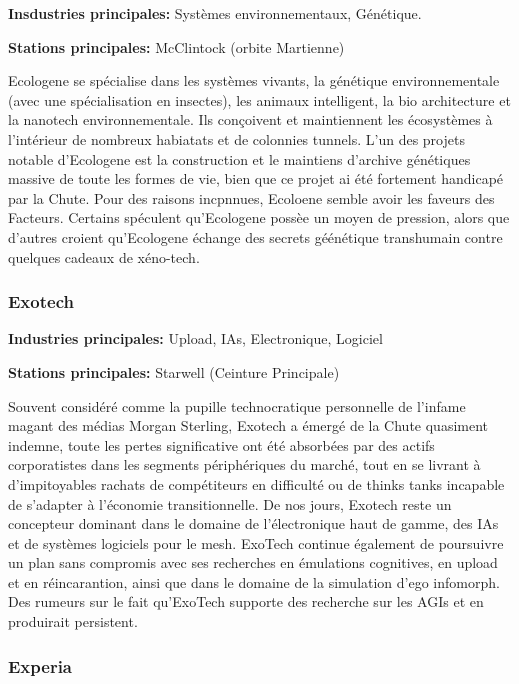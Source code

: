                   \textbf{Insdustries principales:} Systèmes environnementaux, Génétique. 

                  \textbf{Stations principales:} McClintock (orbite Martienne) 

                  Ecologene se spécialise dans les systèmes vivants, la génétique environnementale (avec une spécialisation en insectes), les animaux intelligent, la bio architecture et la nanotech environnementale. Ils conçoivent et maintiennent les écosystèmes à l'intérieur de nombreux habiatats et de colonnies tunnels. L'un des projets notable d'Ecologene est la construction et le maintiens d'archive génétiques massive de toute les formes de vie, bien que ce projet ai été fortement handicapé par la Chute. Pour des raisons incpnnues, Ecoloene semble avoir les faveurs des Facteurs. Certains spéculent qu'Ecologene possèe un moyen de pression, alors que d'autres croient qu'Ecologene échange des secrets géénétique transhumain contre quelques cadeaux de xéno-tech. 

                  \subsubsection{Exotech} \label{sec:exotech} 

                  \textbf{Industries principales:} Upload, IAs, Electronique, Logiciel 

                  \textbf{Stations principales:} Starwell (Ceinture Principale) 

                  Souvent considéré comme la pupille technocratique personnelle de l'infame magant des médias Morgan Sterling, Exotech a émergé de la Chute quasiment indemne, toute les pertes significative ont été absorbées par des actifs corporatistes dans les segments périphériques du marché, tout en  se livrant à d'impitoyables rachats de compétiteurs en difficulté ou de thinks tanks incapable de s'adapter à l'économie transitionnelle. De nos jours, Exotech reste un concepteur dominant dans le domaine de l'électronique haut de gamme, des IAs et de systèmes logiciels pour le mesh. ExoTech continue également de poursuivre un plan sans compromis avec ses recherches en émulations cognitives, en upload et en réincarantion, ainsi que dans le domaine de la simulation d'ego infomorph. Des rumeurs sur le fait qu'ExoTech supporte des recherche sur les AGIs et en produirait persistent. 

                  \subsubsection{Experia} \label{sec:experia} 


